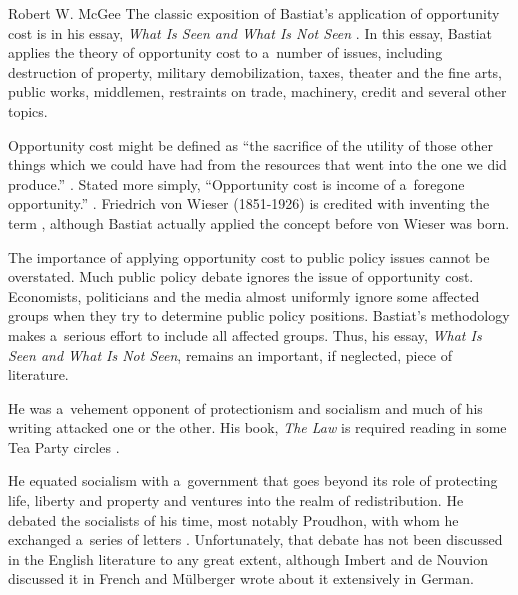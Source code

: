 \begin{artengenv}{Robert W. McGee}
The classic exposition of Bastiat's application of opportunity cost is in his essay, \textit{What Is Seen and What Is Not Seen} 
\parencites[][]{bastiat_ce_1850}[][pp.1–50]{bastiat_selected_1964}[][U:~1-48]{bastiat_bastiat_2007}. %
 In this essay, Bastiat applies the theory of opportunity cost to a~number of issues, including destruction of property, military demobilization, taxes, theater and the fine arts, public works, middlemen, restraints on trade, machinery, credit and several other topics.



Opportunity cost might be defined as ``the sacrifice of the utility of those other things which we could have had from the resources that went into the one we did produce.'' 
\parencite[][p.917]{schumpeter_history_1954}. %
 Stated more simply, ``Opportunity cost is income of a~foregone opportunity.'' 
\parencite[][]{magni_splitting_2009}. %
 Friedrich von Wieser (1851-1926) is credited with inventing the term 
\parencite[][p.184]{skousen_making_2001}, %
 although Bastiat actually applied the concept before von Wieser was born.



The importance of applying opportunity cost to public policy issues cannot be overstated. Much public policy debate ignores the issue of opportunity cost. Economists, politicians and the media almost uniformly ignore some affected groups when they try to determine public policy positions. Bastiat's methodology makes a~serious effort to include all affected groups. Thus, his essay, \textit{What Is Seen and What Is Not Seen}, remains an important, if neglected, piece of literature.



He was a~vehement opponent of protectionism and socialism and much of his writing attacked one or the other. His book, \textit{The Law} 
\parencite*[][]{bastiat_foreward_1998} %
 is required reading in some Tea Party circles 
\parencite[][]{zernike_shaping_2010}.%




He equated socialism with a~government that goes beyond its role of protecting life, liberty and property and ventures into the realm of redistribution. He debated the socialists of his time, most notably Proudhon, with whom he exchanged a~series of letters 
\parencite[][]{bastiat_sophismes_1873}. %
 Unfortunately, that debate has not been discussed in the English literature to any great extent, although Imbert 
\parencite*[][pp.57–66]{imbert_frederic_1913} %
 and de Nouvion 
\parencite*[][pp.256–269]{nouvion_frederic_1905} %
 discussed it in French and Mülberger 
\parencite*[][]{mulberger_kapital_1896} %
 wrote about it extensively in German.




\end{artengenv}
